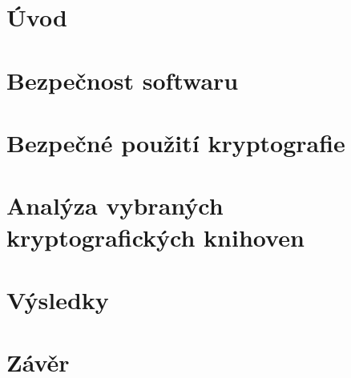 
\chapter*{Úvod}
\setcounter{page}{1}



\chapter{Bezpečnost softwaru}



\chapter{Bezpečné použití kryptografie}



\chapter{Analýza vybraných kryptografických knihoven}



\chapter{Výsledky}



\chapter{Závěr}


